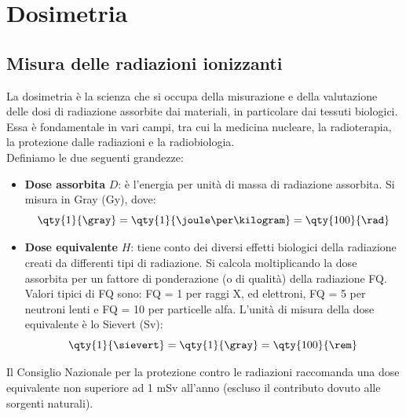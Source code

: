 \chapter{Dosimetria}
\section{Misura delle radiazioni ionizzanti}
La dosimetria è la scienza che si occupa della misurazione e della valutazione delle dosi di radiazione assorbite dai materiali, in particolare dai tessuti biologici. Essa è fondamentale in vari campi, tra cui la medicina nucleare, la radioterapia, la protezione dalle radiazioni e la radiobiologia.\\
Definiamo le due seguenti grandezze:
\begin{itemize}
    \item \textbf{Dose assorbita} $D$: è l'energia per unità di massa di radiazione assorbita. Si misura in Gray (Gy), dove:
    \begin{equation}
        \qty{1}{\gray} = \qty{1}{\joule\per\kilogram} = \qty{100}{\rad}
    \end{equation}
    \item \textbf{Dose equivalente} $H$: tiene conto dei diversi effetti biologici della radiazione creati da differenti tipi di radiazione. Si calcola moltiplicando la dose assorbita per un fattore di ponderazione (o di qualità) della radiazione FQ. Valori tipici di FQ sono: FQ = 1 per raggi X, ed elettroni, FQ = 5 per neutroni lenti e FQ = 10 per particelle alfa. L'unità di misura della dose equivalente è lo Sievert (Sv):
    \begin{equation}
        \qty{1}{\sievert} = \qty{1}{\gray} = \qty{100}{\rem}
    \end{equation}
\end{itemize}
Il Consiglio Nazionale per la protezione contro le radiazioni raccomanda una dose equivalente non superiore ad 1 mSv all'anno (escluso il contributo dovuto alle sorgenti naturali).
